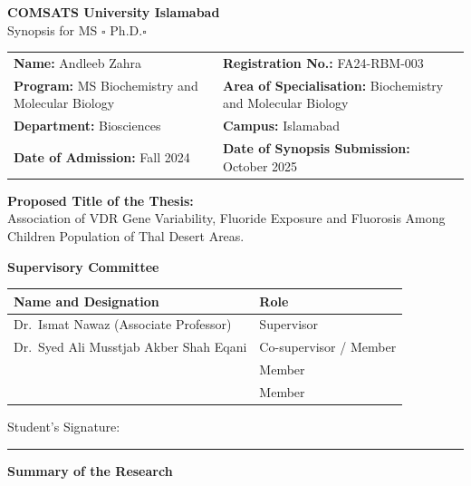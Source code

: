\documentclass[12pt,a4paper]{article}
\begin{document}
\begin{center}
    {\large\bfseries COMSATS University Islamabad}\\[4pt]
    {\large Synopsis for MS $\square$ \quad Ph.D.$\square$}
\end{center}

\bigskip
\noindent
\begin{tabular}{@{}p{5.5cm} p{8cm}@{}}
\textbf{Name:} Andleeb Zahra &
\textbf{Registration No.:} FA24-RBM-003 \\[4pt]
\textbf{Program:} MS Biochemistry and Molecular Biology &
\textbf{Area of Specialisation:} Biochemistry and Molecular Biology \\[4pt]
\textbf{Department:} Biosciences &
\textbf{Campus:} Islamabad \\[4pt]
\textbf{Date of Admission:} Fall 2024 &
\textbf{Date of Synopsis Submission:} October 2025 \\
\end{tabular}

\bigskip
\noindent\textbf{Proposed Title of the Thesis:}\\
Association of VDR Gene Variability, Fluoride Exposure and Fluorosis Among Children
Population of Thal Desert Areas.

\bigskip
\noindent\textbf{Supervisory Committee}

\begin{center}
\begin{tabular}{|p{8cm}|p{5cm}|}
\hline
\textbf{Name and Designation} & \textbf{Role} \\
\hline
Dr.\ Ismat Nawaz (Associate Professor) & Supervisor \\
\hline
Dr.\ Syed Ali Musstjab Akber Shah Eqani & Co-supervisor / Member \\
\hline
 & Member \\
\hline
 & Member \\
\hline
\end{tabular}
\end{center}

\vspace{1cm}
\noindent Student's Signature: \underline{\hspace{6cm}}

\bigskip\hrule\bigskip

\noindent\textbf{Summary of the Research}
\end{document}
